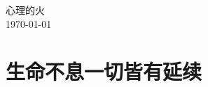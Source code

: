 \documentclass[UTF8, 12pt, a4paper]{ctexrep} %
\begin{document}
\begin{titlepage}
    \centering
    {\sffamily\fontsize{40}{50}心理的火}\\
    {\today}
\end{titlepage}


\section*{生命不息一切皆有延续}
\newpage
\end{document}
